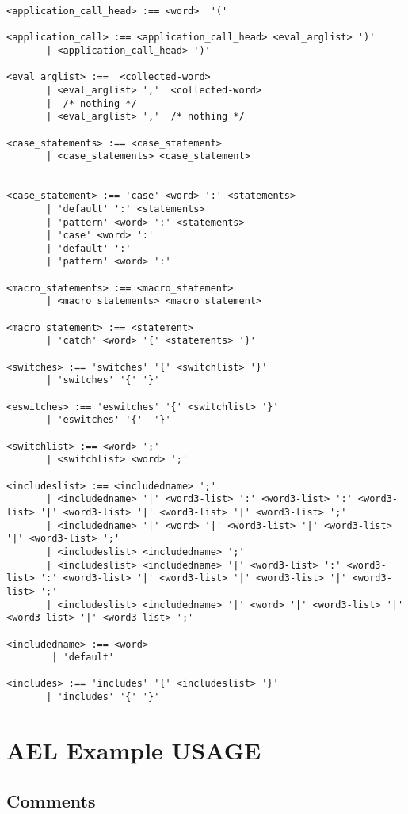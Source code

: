 {\begin{verbatim}
<application_call_head> :== <word>  '('

<application_call> :== <application_call_head> <eval_arglist> ')'
       | <application_call_head> ')'

<eval_arglist> :==  <collected-word>
       | <eval_arglist> ','  <collected-word>
       |  /* nothing */
       | <eval_arglist> ','  /* nothing */

<case_statements> :== <case_statement>
       | <case_statements> <case_statement>


<case_statement> :== 'case' <word> ':' <statements>
       | 'default' ':' <statements>
       | 'pattern' <word> ':' <statements>
       | 'case' <word> ':'
       | 'default' ':'
       | 'pattern' <word> ':'

<macro_statements> :== <macro_statement>
       | <macro_statements> <macro_statement>

<macro_statement> :== <statement>
       | 'catch' <word> '{' <statements> '}'

<switches> :== 'switches' '{' <switchlist> '}'
       | 'switches' '{' '}'

<eswitches> :== 'eswitches' '{' <switchlist> '}'
       | 'eswitches' '{'  '}'

<switchlist> :== <word> ';'
       | <switchlist> <word> ';'

<includeslist> :== <includedname> ';'
       | <includedname> '|' <word3-list> ':' <word3-list> ':' <word3-list> '|' <word3-list> '|' <word3-list> '|' <word3-list> ';'
       | <includedname> '|' <word> '|' <word3-list> '|' <word3-list> '|' <word3-list> ';'
       | <includeslist> <includedname> ';'
       | <includeslist> <includedname> '|' <word3-list> ':' <word3-list> ':' <word3-list> '|' <word3-list> '|' <word3-list> '|' <word3-list> ';'
       | <includeslist> <includedname> '|' <word> '|' <word3-list> '|' <word3-list> '|' <word3-list> ';'

<includedname> :== <word>
        | 'default'

<includes> :== 'includes' '{' <includeslist> '}'
       | 'includes' '{' '}'

\end{verbatim}


\section{AEL Example USAGE}

\subsection{Comments}

}
